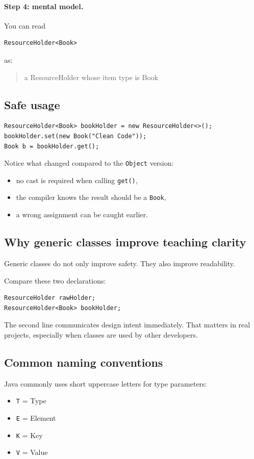 \documentclass[11pt]{article}
\begin{document}
\paragraph{Step 4: mental model.}
You can read
\begin{lstlisting}
ResourceHolder<Book>
\end{lstlisting}
as:
\begin{quote}
a ResourceHolder whose item type is Book
\end{quote}

\subsection{Safe usage}
\begin{lstlisting}
ResourceHolder<Book> bookHolder = new ResourceHolder<>();
bookHolder.set(new Book("Clean Code"));
Book b = bookHolder.get();
\end{lstlisting}

Notice what changed compared to the \texttt{Object} version:
\begin{itemize}
  \item no cast is required when calling \texttt{get()},
  \item the compiler knows the result should be a \texttt{Book},
  \item a wrong assignment can be caught earlier.
\end{itemize}

\subsection{Why generic classes improve teaching clarity}
Generic classes do not only improve safety.
They also improve readability.

Compare these two declarations:
\begin{lstlisting}
ResourceHolder rawHolder;
ResourceHolder<Book> bookHolder;
\end{lstlisting}

The second line communicates design intent immediately.
That matters in real projects, especially when classes are used by other developers.

\subsection{Common naming conventions}
Java commonly uses short uppercase letters for type parameters:
\begin{itemize}
  \item \texttt{T} = Type
  \item \texttt{E} = Element
  \item \texttt{K} = Key
  \item \texttt{V} = Value
\end{itemize}
\end{document}
